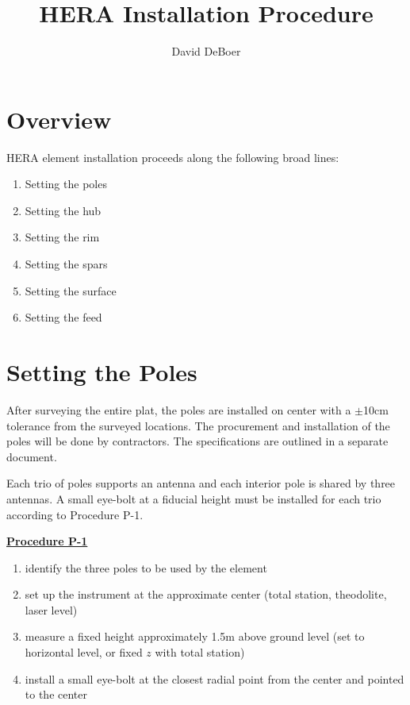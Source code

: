 \documentclass[11pt]{article}
\begin{document}
\title{HERA Installation Procedure}
\author{David DeBoer}
\maketitle

\setcounter{tocdepth}{3}
\setcounter{section}{0}
\tableofcontents

\section{Overview}
HERA element installation proceeds along the following broad lines:

\begin{enumerate}
\item Setting the poles
\item Setting the hub
\item Setting the rim
\item Setting the spars
\item Setting the surface
\item Setting the feed
\end{enumerate}

\section{Setting the Poles}
After surveying the entire plat, the poles are installed on center with a $\pm$10cm tolerance from the surveyed locations.  The procurement and installation of the poles will be done by contractors.  The specifications are outlined in a separate document.

Each trio of poles supports an antenna and each interior pole is shared by three antennas.  A small eye-bolt at a fiducial height must be installed for each trio according to Procedure P-1.

\vspace{0.5cm}
\underline{\textbf{Procedure P-1}}
\begin{enumerate}
\item identify the three poles to be used by the element
\item set up the instrument at the approximate center (total station, theodolite, laser level)
\item measure a fixed height approximately 1.5m above ground level (set to horizontal level, or fixed $z$ with total station)
\item install a small eye-bolt at the closest radial point from the center and pointed to the center
\end{enumerate}
\end{document}
